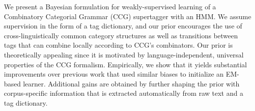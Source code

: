 We present a Bayesian formulation for weakly-supervised learning of a Combinatory Categorial Grammar (CCG) supertagger with an HMM. We assume supervision in the form of a tag dictionary, and our prior encourages the use of cross-linguistically common category structures as well as transitions between tags that can combine locally according to CCG's combinators. Our prior is theoretically appealing since it is motivated by language-independent, universal properties of the CCG formalism. Empirically, we show that it yields substantial improvements over previous work that used similar biases to initialize an EM-based learner. Additional gains are obtained by further shaping the prior with corpus-specific information that is extracted automatically from raw text and a tag dictionary.
